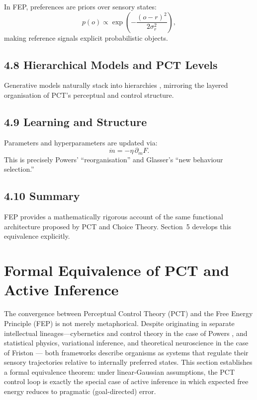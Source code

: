 \documentclass[11pt,a4paper,twoside]{article}
\begin{document}
In FEP, preferences are priors over sensory states:
\[
p(o) \propto \exp\!\left(-\frac{(o-r)^2}{2\sigma_r^2}\right),
\]
making reference signals explicit probabilistic objects.

\subsection*{4.8 Hierarchical Models and PCT Levels}

Generative models naturally stack into hierarchies \cite{hohwy2013},
mirroring the layered organisation of PCT’s perceptual and control structure.

\subsection*{4.9 Learning and Structure}

Parameters and hyperparameters are updated via:
\[
\dot{m} = -\eta\,\partial_m F.
\]
This is precisely Powers’ ``reorganisation'' and Glasser’s ``new behaviour selection.''

\subsection*{4.10 Summary}

FEP provides a mathematically rigorous account of the same functional architecture
proposed by PCT and Choice Theory.
Section~5 develops this equivalence explicitly.

\newpage


\section{Formal Equivalence of PCT and Active Inference}

The convergence between Perceptual Control Theory (PCT) and the Free Energy Principle (FEP)
is not merely metaphorical.
Despite originating in separate intellectual lineages—cybernetics and control theory in the case of Powers
\cite{powers1973behavior,powers2005behavior},
and statistical physics, variational inference, and theoretical neuroscience in the case of Friston
\cite{friston2009free,friston2010free}—
both frameworks describe organisms as systems that regulate their sensory trajectories
relative to internally preferred states.
This section establishes a formal equivalence theorem:
under linear-Gaussian assumptions, the PCT control loop is exactly the special case
of active inference in which expected free energy reduces to pragmatic (goal-directed) error.
\end{document}

